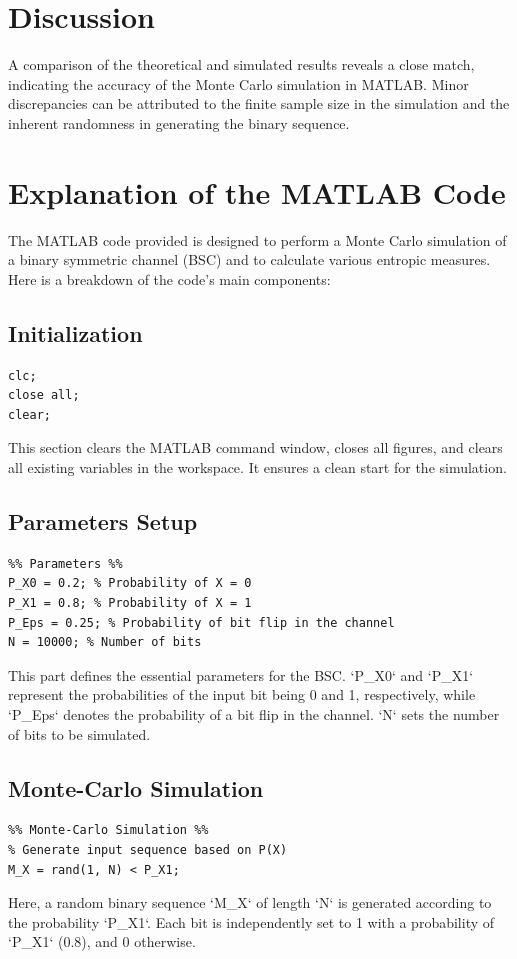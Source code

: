 \documentclass{article}
\begin{document}
\section{Discussion}
A comparison of the theoretical and simulated results reveals a close match, indicating the accuracy of the Monte Carlo simulation in MATLAB. Minor discrepancies can be attributed to the finite sample size in the simulation and the inherent randomness in generating the binary sequence.

\section{Explanation of the MATLAB Code}
The MATLAB code provided is designed to perform a Monte Carlo simulation of a binary symmetric channel (BSC) and to calculate various entropic measures. Here is a breakdown of the code's main components:

\subsection{Initialization}
\begin{verbatim}
clc;
close all;
clear;
\end{verbatim}
This section clears the MATLAB command window, closes all figures, and clears all existing variables in the workspace. It ensures a clean start for the simulation.

\subsection{Parameters Setup}
\begin{verbatim}
%% Parameters %%
P_X0 = 0.2; % Probability of X = 0
P_X1 = 0.8; % Probability of X = 1
P_Eps = 0.25; % Probability of bit flip in the channel
N = 10000; % Number of bits
\end{verbatim}
This part defines the essential parameters for the BSC. `P\_X0` and `P\_X1` represent the probabilities of the input bit being 0 and 1, respectively, while `P\_Eps` denotes the probability of a bit flip in the channel. `N` sets the number of bits to be simulated.

\subsection{Monte-Carlo Simulation}
\begin{verbatim}
%% Monte-Carlo Simulation %%
% Generate input sequence based on P(X)
M_X = rand(1, N) < P_X1;
\end{verbatim}
Here, a random binary sequence `M\_X` of length `N` is generated according to the probability `P\_X1`. Each bit is independently set to 1 with a probability of `P\_X1` (0.8), and 0 otherwise.
\end{document}
